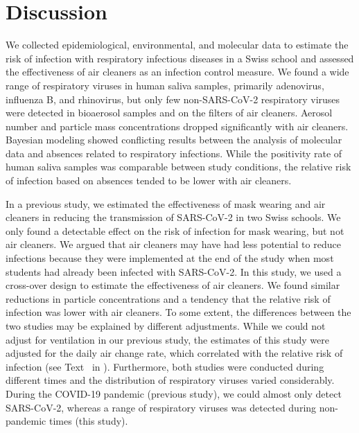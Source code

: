\documentclass[fleqn,11pt]{wlscirep}
\begin{document}
\FloatBarrier

\newpage

\section{Discussion}


We collected epidemiological, environmental, and molecular data to estimate the risk of infection with respiratory infectious diseases in a Swiss school and assessed the effectiveness of air cleaners as an infection control measure. We found a wide range of respiratory viruses in human saliva samples, primarily adenovirus, influenza B, and rhinovirus, but only few non-SARS-CoV-2 respiratory viruses were detected in bioaerosol samples and on the filters of air cleaners. Aerosol number and particle mass concentrations dropped significantly with air cleaners. Bayesian modeling showed conflicting results between the analysis of molecular data and absences related to respiratory infections. While the positivity rate of human saliva samples was comparable between study conditions, the relative risk of infection based on absences tended to be lower with air cleaners.


In a previous study\cite{Banholzer2023PLoSMed}, we estimated the effectiveness of mask wearing and air cleaners in reducing the transmission of SARS-CoV-2 in two Swiss schools. We only found a detectable effect on the risk of infection for mask wearing, but not air cleaners. We argued that air cleaners may have had less potential to reduce infections because they were implemented at the end of the study when most students had already been infected with SARS-CoV-2. In this study, we used a cross-over design to estimate the effectiveness of air cleaners. We found similar reductions in particle concentrations and a tendency that the relative risk of infection was lower with air cleaners. To some extent, the differences between the two studies may be explained by different adjustments. While we could not adjust for ventilation in our previous study, the estimates of this study were adjusted for the daily air change rate, which correlated with the relative risk of infection (see Text~ in \supp). Furthermore, both studies were conducted during different times and the distribution of respiratory viruses varied considerably. During the COVID-19 pandemic (previous study), we could almost only detect SARS-CoV-2, whereas a range of respiratory viruses was detected during non-pandemic times (this study). 
\end{document}
